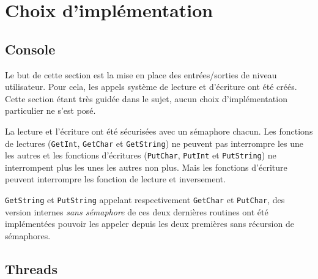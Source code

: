 \documentclass{article}
\begin{document}
\section{Choix d'implémentation}
	\subsection{Console}
	  	{Le but de cette section est la mise en place des entrées/sorties de niveau utilisateur. Pour cela, les appels système de lecture et d'écriture ont été créés. Cette section étant très guidée dans le sujet, aucun choix d'implémentation particulier ne s'est posé.}
	     ~\par{La lecture et l'écriture ont été sécurisées avec un sémaphore chacun. Les fonctions de lectures (\texttt{GetInt}, \texttt{GetChar} et \texttt{GetString}) ne peuvent pas interrompre les une les autres et les fonctions d'écritures (\texttt{PutChar}, \texttt{PutInt} et \texttt{PutString}) ne interrompent plus les unes les autres non plus. Mais les fonctions d'écriture peuvent interrompre les fonction de lecture et inversement.}
		~\par{\texttt{GetString} et \texttt{PutString} appelant respectivement \texttt{GetChar} et \texttt{PutChar}, des version internes \emph{sans sémaphore} de ces deux dernières routines ont été implémentées pouvoir les appeler depuis les deux premières sans récursion de sémaphores.}

	\subsection{Threads}
\end{document}
